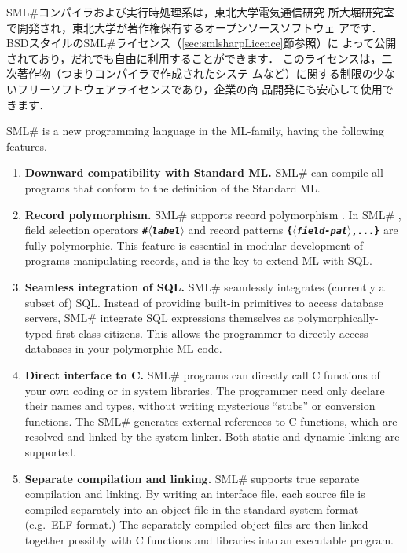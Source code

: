 \documentclass{jbook}
\newcommand{\smlsharp}{SML\#}
\newcommand{\nonterm}[1]{\mbox{$\langle$}{\it #1}\mbox{$\rangle$}}
\begin{document}
	\smlsharp{}コンパイラおよび実行時処理系は，東北大学電気通信研究
所大堀研究室で開発され，東北大学が著作権保有するオープンソースソフトウェ
アです．
	BSDスタイルの\smlsharp{}ライセンス（\ref{sec:smlsharpLicence}節参照）に
よって公開されており，だれでも自由に利用することができます．
	このライセンスは，二次著作物（つまりコンパイラで作成されたシステ
ムなど）に関する制限の少ないフリーソフトウェアライセンスであり，企業の商
品開発にも安心して使用できます．

\else%

	\smlsharp{} is a new programming language in the ML-family,
having the following features.
\begin{enumerate}
\item {\bf Downward compatibility with Standard ML.}
	\smlsharp{} can compile all programs that conform to the
definition of the Standard ML\cite{sml}.

\item {\bf Record polymorphism.}
	\smlsharp{} supports record polymorphism \cite{ohor95toplas}.
	In \smlsharp{} , field selection operators {\bf\tt \#\nonterm{label}}
and record patterns {\bf\tt \{\nonterm{field-pat},...\}} are fully
polymorphic.
	This feature is essential in modular development of programs
manipulating records, and is the key to extend ML with SQL.

\item {\bf Seamless integration of SQL.}
	\smlsharp{} seamlessly integrates (currently a subset of) SQL.
	Instead of providing built-in primitives to access
database servers, \smlsharp{} integrate SQL expressions themselves as
polymorphically-typed first-class citizens.
	This allows the programmer to directly access databases in
your polymorphic ML code.

\item {\bf Direct interface to C.}
	\smlsharp{} programs can directly call C functions of your own
coding or in system libraries.
	The programmer need only declare their names and types, without
writing mysterious ``stubs'' or conversion functions. 
	The \smlsharp{} generates external references to C functions,
which are resolved and linked by the system linker.
	Both static and dynamic linking are supported.

\item {\bf Separate compilation and linking.}
	\smlsharp{} supports true separate compilation and linking.
	By writing an interface file, each source file is compiled
separately into an object file in the standard system format (e.g.\ ELF
format.)
	The separately compiled object files are then linked together
possibly with C functions and libraries into an executable program.


\end{enumerate}
\end{document}
